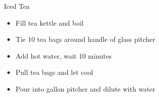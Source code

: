 
\begin{recipe}{Iced Tea}%
  \source{}
  \maketitle

  \begin{itemize}[nosep]
  \item Fill tea kettle and boil
  \item Tie 10 tea bags around handle of glass pitcher
  \item Add hot water, wait 10 minutes
  \item Pull tea bags and let cool
  \item Pour into gallon pitcher and dilute with water
  \end{itemize}
\end{recipe}

